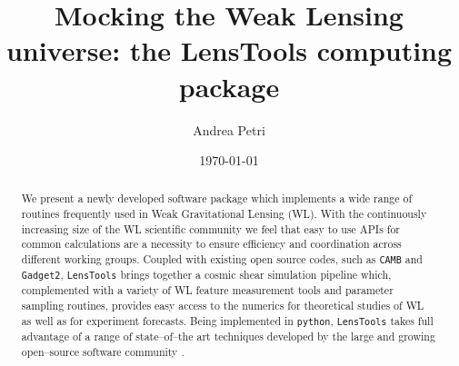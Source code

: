 \documentclass[reprint,aps,prd,superscriptaddress,showkeys,showpacs]{revtex4-1}
\newcommand{\ttt}[1]{\texttt{#1}}
\newcommand{\LT}{\texttt{LensTools} }
\begin{document}
\title{Mocking the Weak Lensing universe: the LensTools computing package}

\author{Andrea Petri}

\date{\today}

\label{firstpage}

\begin{abstract}
We present a newly developed software package which implements a wide range of routines frequently used in Weak Gravitational Lensing (WL). With the continuously increasing size of the WL scientific community we feel that easy to use APIs for common calculations are a necessity to ensure efficiency and coordination across different working groups. Coupled with existing open source codes, such as \ttt{CAMB}\citep{CAMB} and \ttt{Gadget2}\citep{Gadget2}, \LT brings together a cosmic shear simulation pipeline which, complemented with a variety of WL feature measurement tools and parameter sampling routines, provides easy access to the numerics for theoretical studies of WL as well as for experiment forecasts. Being implemented in \ttt{python}\citep{python}, \LT takes full advantage of a range of state--of--the art techniques developed by the large and growing open--source software community \citep{scipy,pandas,astropy,scikit-learn,emcee}.    
    
\end{abstract}



\maketitle


\end{document}
